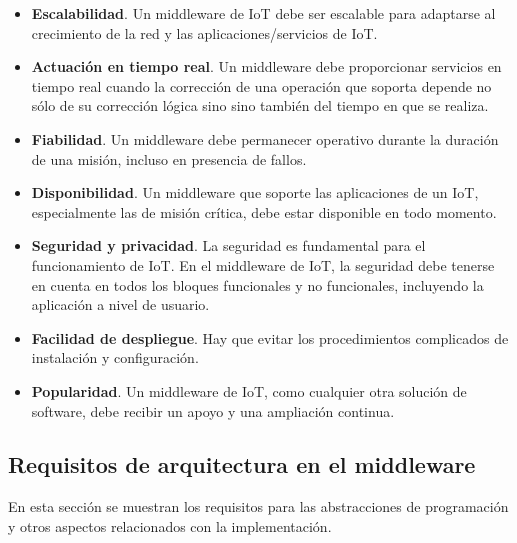   \begin{itemize}
     \item \textbf{Escalabilidad}. Un middleware de IoT debe ser escalable para adaptarse al crecimiento de la red y las aplicaciones/servicios de IoT.
     \item \textbf{Actuación en tiempo real}. Un middleware debe proporcionar servicios en tiempo real cuando la corrección de una operación que soporta depende no sólo de su corrección lógica sino sino también del tiempo en que se realiza.
     \item \textbf{Fiabilidad}. Un middleware debe permanecer operativo durante la duración de una misión, incluso en presencia de fallos.
     \item \textbf{Disponibilidad}. Un middleware que soporte las aplicaciones de un IoT, especialmente las de misión crítica, debe estar disponible en todo momento.
     \item \textbf{Seguridad y privacidad}. La seguridad es fundamental para el funcionamiento de IoT. En el middleware de IoT, la seguridad debe tenerse en cuenta en todos los bloques funcionales y no funcionales, incluyendo la aplicación a nivel de usuario.
     \item \textbf{Facilidad de despliegue}. Hay que evitar los procedimientos complicados de instalación y configuración.
     \item \textbf{Popularidad}. Un middleware de IoT, como cualquier otra solución de software, debe recibir un apoyo y una ampliación continua.
 \end{itemize}
 
\subsection{Requisitos de arquitectura en el middleware}

En esta sección se muestran los requisitos para las abstracciones de programación y otros aspectos relacionados con la implementación.

